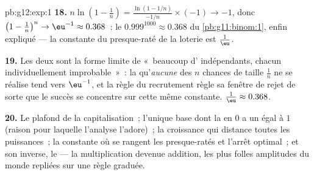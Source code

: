 \begin{solution}{pb:g12:exp:1}
\textbf{18.} $n \ln\!\left(1 - \frac1n\right) =
\frac{\ln(1 - 1/n)}{-1/n} \times (-1) \to -1$, donc
$\left(1 - \frac1n\right)^n \to \eu^{-1} \approx 0.368$~: le
$0.999^{1000} \approx 0.368$ du \cref{pb:g11:binom:1}, enfin
expliqué --- la constante du presque-raté de la loterie est
$\frac1\eu$.

\textbf{19.} Les deux sont la forme limite de «~beaucoup
d' indépendants, chacun individuellement improbable~»~: la
 qu'\emph{aucune} des $n$ chances de taille $\frac1n$ ne
se réalise tend vers $\eu^{-1}$, et la règle du recrutement règle sa
fenêtre de rejet de sorte que le succès se concentre sur cette même
constante. $\frac1\eu \approx 0.368$.

\textbf{20.} Le plafond de la capitalisation~; l'unique base dont la
 en $0$ a un  égal à $1$ (raison pour
laquelle l'analyse l'adore)~; la croissance qui distance toutes les
puissances~; la constante où se rangent les presque-ratés et l'arrêt
optimal~; et son inverse, le  --- la multiplication
devenue addition, les plus folles amplitudes du monde repliées sur
une règle graduée.
\end{solution}
